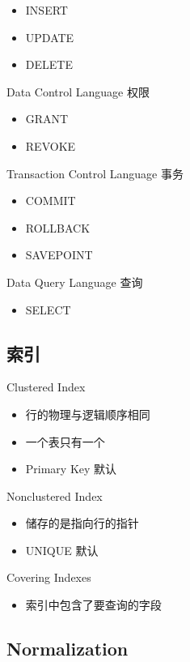 \documentclass[11pt,journal,compsoc]{IEEEtran}
\begin{document}
\begin{itemize}
    \item INSERT
    \item UPDATE
    \item DELETE
\end{itemize}

Data Control Language 权限

\begin{itemize}
    \item GRANT
    \item REVOKE
\end{itemize}

Transaction Control Language 事务

\begin{itemize}
    \item COMMIT
    \item ROLLBACK
    \item SAVEPOINT
\end{itemize}

Data Query Language 查询

\begin{itemize}
    \item SELECT
\end{itemize}


\subsection{索引}

Clustered Index

\begin{itemize}
    \item 行的物理与逻辑顺序相同
    \item 一个表只有一个
    \item Primary Key 默认
\end{itemize}

Nonclustered Index

\begin{itemize}
    \item 储存的是指向行的指针
    \item UNIQUE 默认
\end{itemize}

Covering Indexes

\begin{itemize}
    \item 索引中包含了要查询的字段
\end{itemize}


\subsection{Normalization}
\end{document}
